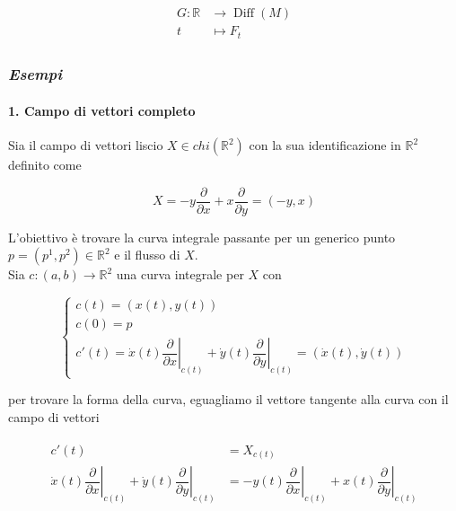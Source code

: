\begin{align}
	\begin{split}
		G : \mathbb{R} &\to \operatorname{Diff}(M)\\
		t &\mapsto F_{t}
	\end{split}
\end{align}

\subsubsection{\textit{Esempi}}

\paragraph{1. Campo di vettori completo}

Sia il campo di vettori liscio $ X \in chi(\mathbb{R}^{2}) $ con la sua identificazione in $ \mathbb{R}^{2} $ definito come

\begin{equation}
	X = - y \dfrac{\partial}{\partial x} + x \dfrac{\partial}{\partial y} = (-y, x)
\end{equation}

L'obiettivo è trovare la curva integrale passante per un generico punto $ p = (p^{1},p^{2}) \in \mathbb{R}^{2} $ e il flusso di $ X $.\\
Sia $ c : (a,b) \to \mathbb{R}^{2} $ una curva integrale per $ X $ con

\begin{equation}
	\begin{cases}
		c(t) = (x(t),y(t))\\
		c(0) = p\\
		c'(t) = \dot{x}(t) \left. \dfrac{\partial}{\partial x} \right|_{c(t)} + \dot{y}(t) \left. \dfrac{\partial}{\partial y} \right|_{c(t)} = (\dot{x}(t),\dot{y}(t))		
	\end{cases}
\end{equation}

per trovare la forma della curva, eguagliamo il vettore tangente alla curva con il campo di vettori

\begin{align}
	\begin{split}
		c'(t) &= X_{c(t)}\\
		\dot{x}(t) \left. \dfrac{\partial}{\partial x} \right|_{c(t)} + \dot{y}(t) \left. \dfrac{\partial}{\partial y} \right|_{c(t)} &= - y(t) \left. \dfrac{\partial}{\partial x} \right|_{c(t)} + x(t) \left. \dfrac{\partial}{\partial y} \right|_{c(t)}
	\end{split}
\end{align}

